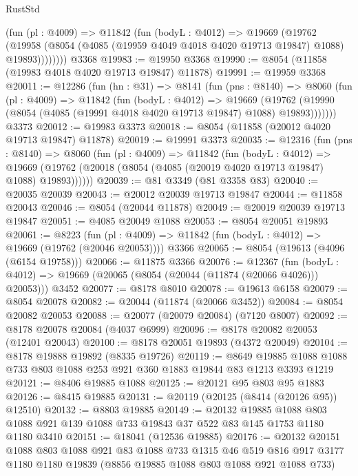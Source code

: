 \begin{lexlean}{RustStd}
\begin{coremodule}
          (fun (pl : @4009) =>
          @11842
            (fun (bodyL : @4012) =>
            @19669
              (@19762
                (@19958 (@8054 (@4085 (@19959 @4049 @4018 @4020 @19713 @19847) @1088) @19893))))))))
    @3368
@19983 := @19950 @3368
@19990 := @8054 (@11858 (@19983 @4018 @4020 @19713 @19847) @11878)
@19991 := @19959 @3368
@20011 := @12286
    (fun (hn : @31) =>
    @8141
      (fun (pns : @8140) =>
      @8060
        (fun (pl : @4009) =>
        @11842
          (fun (bodyL : @4012) =>
          @19669
            (@19762 (@19990 (@8054 (@4085 (@19991 @4018 @4020 @19713 @19847) @1088) @19893)))))))
    @3373
@20012 := @19983 @3373
@20018 := @8054 (@11858 (@20012 @4020 @19713 @19847) @11878)
@20019 := @19991 @3373
@20035 := @12316
    (fun (pns : @8140) =>
    @8060
      (fun (pl : @4009) =>
      @11842
        (fun (bodyL : @4012) =>
        @19669 (@19762 (@20018 (@8054 (@4085 (@20019 @4020 @19713 @19847) @1088) @19893))))))
@20039 := @81 @3349 (@81 @3358 @83)
@20040 := @20035 @20039
@20043 := @20012 @20039 @19713 @19847
@20044 := @11858 @20043
@20046 := @8054 (@20044 @11878)
@20049 := @20019 @20039 @19713 @19847
@20051 := @4085 @20049 @1088
@20053 := @8054 @20051 @19893
@20061 := @8223
    (fun (pl : @4009) => @11842 (fun (bodyL : @4012) => @19669 (@19762 (@20046 @20053))))
    @3366
@20065 := @8054 (@19613 (@4096 (@6154 @19758)))
@20066 := @11875 @3366
@20076 := @12367
    (fun (bodyL : @4012) => @19669 (@20065 (@8054 (@20044 (@11874 (@20066 @4026))) @20053)))
    @3452
@20077 := @8178 @8010
@20078 := @19613 @6158
@20079 := @8054 @20078
@20082 := @20044 (@11874 (@20066 @3452))
@20084 := @8054 @20082 @20053
@20088 := @20077 (@20079 @20084) (@7120 @8007)
@20092 := @8178 @20078 @20084 (@4037 @6999)
@20096 := @8178 @20082 @20053 (@12401 @20043)
@20100 := @8178 @20051 @19893 (@4372 @20049)
@20104 := @8178 @19888 @19892 (@8335 @19726)
@20119 := @8649 @19885 @1088 @1088 @733 @803 @1088 @253 @921 @360 @1883 @19844 @83 @1213 @3393 @1219
@20121 := @8406 @19885 @1088
@20125 := @20121 @95 @803 @95 @1883
@20126 := @8415 @19885
@20131 := @20119 (@20125 (@8414 (@20126 @95)) @12510)
@20132 := @8803 @19885
@20149 := @20132
    @19885
    @1088
    @803
    @1088
    @921
    @139
    @1088
    @733
    @19843
    @37
    @522
    @83
    @145
    @1753
    @1180
    @1180
    @3410
@20151 := @18041 (@12536 @19885)
@20176 := @20132
    @20151
    @1088
    @803
    @1088
    @921
    @83
    @1088
    @733
    @1315
    @46
    @519
    @816
    @917
    @3177
    @1180
    @1180
    @19839
    (@8856 @19885 @1088 @803 @1088 @921 @1088 @733)

\end{coremodule}
\end{lexlean}
